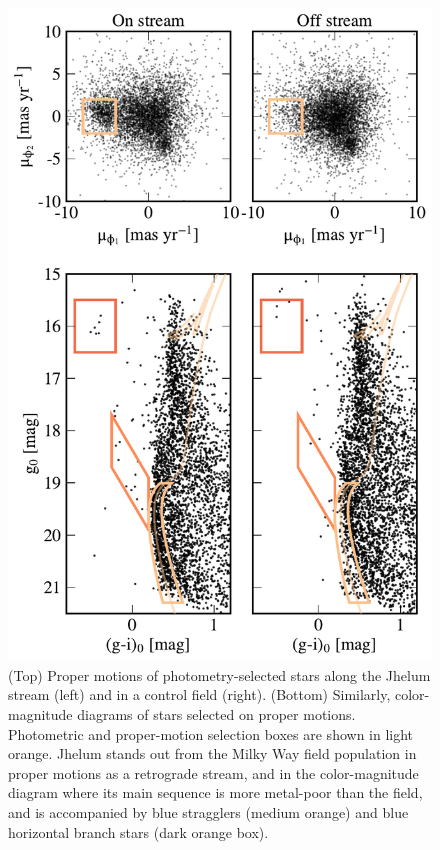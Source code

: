 \documentclass[twocolumn]{aastex62}
\begin{document}
\begin{figure}
\begin{center}
\includegraphics[width=0.99\columnwidth]{selection.pdf}
\end{center}
\caption{
(Top) Proper motions of photometry-selected stars along the Jhelum stream (left) and in a control field (right).
(Bottom) Similarly, color-magnitude diagrams of stars selected on proper motions.
Photometric and proper-motion selection boxes are shown in light orange.
Jhelum stands out from the Milky Way field population in proper motions as a retrograde stream, and in the color-magnitude diagram where its main sequence is more metal-poor than the field, and is accompanied by blue stragglers (medium orange) and blue horizontal branch stars (dark orange box).
}
\label{fig:properties}
\end{figure}
\end{document}
